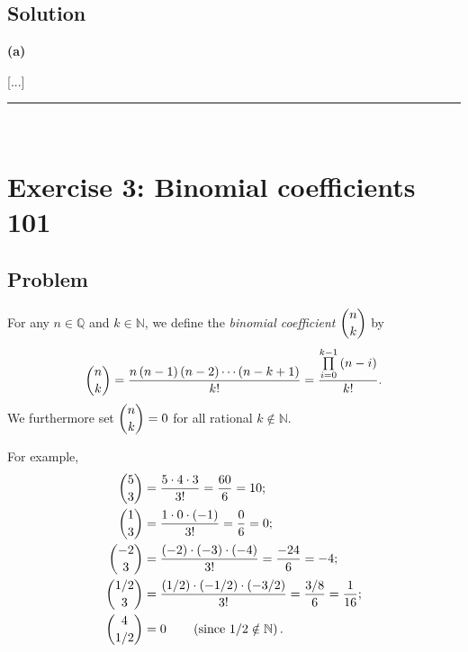 \documentclass[paper=a4, fontsize=12pt]{scrartcl} %
\newcommand{\QQ}{\mathbb{Q}} %
\newcommand{\NN}{\mathbb{N}} %
\newcommand{\tup}[1]{\left( #1 \right)}
\newcommand{\horrule}[1]{\rule{\linewidth}{#1}} %
\let\prodnonlimits\prod
\renewcommand{\prod}{\prodnonlimits\limits}
\theoremstyle{plainsl}
\theoremstyle{definition}
\theoremstyle{remark}
\begin{document}
\subsection{Solution}

\textbf{(a)} 

[...]

\horrule{0.3pt} \\[0.4cm]

\section{Exercise 3: Binomial coefficients 101}

\subsection{Problem}

For any $n \in \QQ$ and $k \in \NN$, we define the
\textit{binomial coefficient} $\dbinom{n}{k}$ by
\[
\dbinom{n}{k}
= \dfrac{ n \tup{n-1} \tup{n-2} \cdots \tup{n-k+1} }{k!}
= \dfrac{ \prod_{i=0}^{k-1} \tup{n-i} }{k!} .
\]
We furthermore set $\dbinom{n}{k} = 0$ for all rational
$k \notin \NN$.

For example,
\begin{align*}
\dbinom{5}{3} &= \dfrac{5 \cdot 4 \cdot 3}{3!} = \dfrac{60}{6} = 10; \\
\dbinom{1}{3} &= \dfrac{1 \cdot 0 \cdot \tup{-1}}{3!} = \dfrac{0}{6} = 0; \\
\dbinom{-2}{3} &= \dfrac{\tup{-2} \cdot \tup{-3} \cdot \tup{-4}}{3!} = \dfrac{-24}{6} = -4; \\
\dbinom{1/2}{3} &= \dfrac{\tup{1/2} \cdot \tup{-1/2} \cdot \tup{-3/2}}{3!} = \dfrac{3/8}{6} = \dfrac{1}{16}; \\
\dbinom{4}{1/2} &= 0 \qquad \tup{\text{since $1/2 \notin \NN$}} .
\end{align*}
\end{document}
